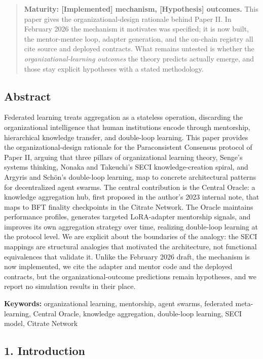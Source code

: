 \begin{quote}
\textbf{Maturity: {[}Implemented{]} mechanism, {[}Hypothesis{]}
outcomes.} This paper gives the organizational-design rationale behind
Paper II. In February 2026 the mechanism it motivates was specified; it
is now built, the mentor-mentee loop, adapter generation, and the
on-chain registry all cite source and deployed contracts. What remains
untested is whether the \emph{organizational-learning outcomes} the
theory predicts actually emerge, and those stay explicit hypotheses with
a stated methodology.
\end{quote}

\subsection{Abstract}\label{abstract}

Federated learning treats aggregation as a stateless operation,
discarding the organizational intelligence that human institutions
encode through mentorship, hierarchical knowledge transfer, and
double-loop learning. This paper provides the organizational-design
rationale for the Paraconsistent Consensus protocol of Paper II, arguing
that three pillars of organizational learning theory, Senge's systems
thinking, Nonaka and Takeuchi's SECI knowledge-creation spiral, and
Argyris and Schön's double-loop learning, map to concrete architectural
patterns for decentralized agent swarms. The central contribution is the
Central Oracle: a knowledge aggregation hub, first proposed in the
author's 2023 internal note, that maps to BFT finality checkpoints in
the Citrate Network. The Oracle maintains performance profiles,
generates targeted LoRA-adapter mentorship signals, and improves its own
aggregation strategy over time, realizing double-loop learning at the
protocol level. We are explicit about the boundaries of the analogy: the
SECI mappings are structural analogies that motivated the architecture,
not functional equivalences that validate it. Unlike the February 2026
draft, the mechanism is now implemented, we cite the adapter and mentor
code and the deployed contracts, but the organizational-outcome
predictions remain hypotheses, and we report no simulation results in
their place.

\textbf{Keywords:} organizational learning, mentorship, agent swarms,
federated meta-learning, Central Oracle, knowledge aggregation,
double-loop learning, SECI model, Citrate Network

\subsection{1. Introduction}\label{introduction}

